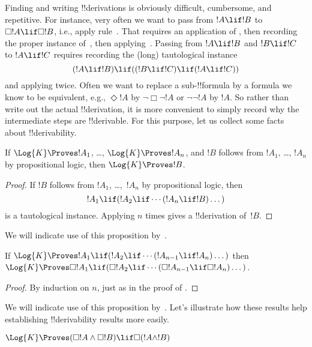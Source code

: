 \documentclass[../../../include/open-logic-section]{subfiles}
\begin{document}


Finding and writing !!{derivation}s is obviously difficult,
cumbersome, and repetitive. For instance, very often we want to pass
from $!A \lif !B$ to $\Box !A \lif \Box !B$, i.e., apply
rule~\RK. That requires an application of \Nec, then recording the
proper instance of~, then applying~\MP. Passing from $!A \lif
!B$ and $!B \lif !C$ to $!A \lif !C$ requires recording the (long)
tautological instance
\[
(!A \lif !B) \lif ((!B \lif !C) \lif (!A \lif !C))
\]
and applying \MP{} twice. Often we want to replace a sub-!!{formula}
by a formula we know to be equivalent, e.g., $\Diamond !A$ by
$\lnot\Box\lnot !A$ or $\lnot\lnot !A$ by $!A$. So rather than write
out the actual !!{derivation}, it is more convenient to simply record
why the intermediate steps are !!{derivable}. For this purpose, let us
collect some facts about !!{derivability}.

\begin{prop}
  If $\Log{K} \Proves !A_1$, \dots, $\Log{K} \Proves !A_n$, and $!B$
  follows from $!A_1$, \dots, $!A_n$ by propositional logic, then
  $\Log{K} \Proves !B$.
\end{prop}

\begin{proof}
  If $!B$ follows from $!A_1$, \dots,~$!A_n$ by propositional logic, then
  \[
  !A_1 \lif (!A_2 \lif \cdots (!A_n \lif !B)\dots)
  \]
  is a tautological instance. Applying \MP{} $n$ times gives a
  !!{derivation} of~$!B$.
\end{proof}

We will indicate use of this proposition by~\PL.

\begin{prop}
  If $\Log{K} \Proves !A_1 \lif (!A_2 \lif \cdots (!A_{n-1} \lif
  !A_n)\dots)$ then $\Log{K} \Proves \Box !A_1 \lif (\Box !A_2 \lif
  \cdots (\Box !A_{n-1} \lif \Box !A_n)\dots)$.
\end{prop}

\begin{proof}
  By induction on $n$, just as in the proof of .
\end{proof}

We will indicate use of this proposition by~\RK. Let's illustrate how
these results help establishing !!{derivability} results more easily.

\begin{prop}
  $\Log{K} \Proves (\Box!A \land \Box!B) \lif \Box (!A \land !B)$
\end{prop}
\end{document}
